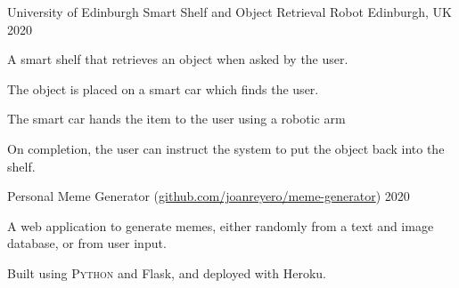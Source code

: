 

\begin{cventries}

  \cventry
    {University of Edinburgh} %
    {Smart Shelf and Object Retrieval Robot {}} %
    {Edinburgh, UK} %
    {2020} %
    {
      \begin{cvitems} %
        \item {A smart shelf that retrieves an object when asked by the user.}
        \item{The object is placed on a smart car which finds the user.}
        \item{The smart car hands the item to the user using a robotic arm}
        \item{On completion, the user can instruct the system to put the object back into the shelf.}
      \end{cvitems}
    }
 
 
  \cventry
    {Personal} %
    {Meme Generator {\tiny (\hyperlink{github.com/joanreyero/meme-generator}{github.com/joanreyero/meme-generator})}} %
    {} %
    {2020} %
    {
      \begin{cvitems} %
        \item {A web application to generate memes, either randomly from a text and image database, or from user input.}
        \item{Built using \textsc{Python} and Flask, and deployed with Heroku.}
      \end{cvitems}
    }



\end{cventries}

